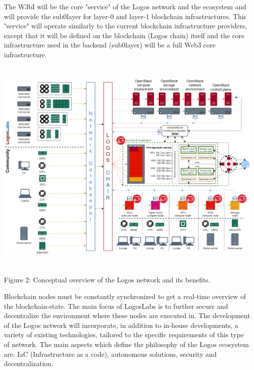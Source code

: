 \documentclass[]{article}
\begin{document}
The W3bI will be the core "service" of the Logos network and the ecosystem and will provide the sub0layer for layer-0 and layer-1 blockchain infrastructures.
This "service" will operate similarly to the current blockchain infrastructure providers, except that it will be defined on the blockchain (Logos chain) itself and the core infrastructure used in the backend (sub0layer) will be a full Web3 core infrastructure.

\begin{center}
	\includegraphics[height=10.8cm]{logos-network}
\end{center}
\begin{center}
	Figure 2: Conceptual overview of the Logos network and its benefits.
\end{center}

Blockchain nodes must be constantly synchronized to get a real-time overview of the blockchain-state.
The main focus of LogosLabs is to further secure and decentralize the environment where these nodes are executed in.
The development of the Logos network will incorporate, in addition to in-house developments, a variety of existing technologies, tailored to the specific requirements of this type of network.
The main aspects which define the philosophy of the Logos ecosystem are: IaC (Infrastructure as a code), autonomous solutions, security and decentralization.

\end{document}
